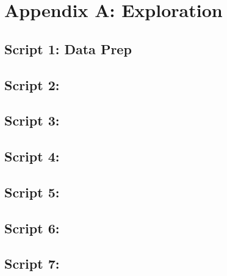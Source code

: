 \chapter{Appendix A: Exploration}
\label{app:a}

\section{Script 1: Data Prep}

\section{Script 2: }

\section{Script 3: }

\section{Script 4: }

\section{Script 5: }

\section{Script 6: }

\section{Script 7: }